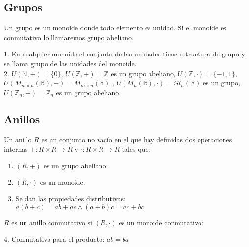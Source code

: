 \subsection{Grupos}

\begin{definition}[Grupo]
Un grupo es un monoide donde todo elemento es unidad. Si el monoide es conmutativo lo llamaremos grupo abeliano.
\end{definition}

\begin{example}
1. En cualquier monoide el conjunto de las unidades tiene estructura de grupo y se llama grupo de las unidades del monoide.\\
2. $U(\mathbb{N},+) = \{0\}$, $U(\mathbb{Z},+) = \mathbb{Z}$ es un grupo abeliano, $U(\mathbb{Z},\cdot) = \{-1,1\}$, $U(M_{m \times n}(\mathbb{R}),+) = M_{m \times n}(\mathbb{R})$ , $U(M_n(\mathbb{R}),\cdot) = Gl_n(\mathbb{R})$ es un grupo, $U(\mathbb{Z}_n,+) = \mathbb{Z}_n$ es un grupo abeliano.
\end{example}


\subsection{Anillos}

\begin{definition}[Anillo]
Un anillo $R$ es un conjunto no vacío en el que hay definidas dos operaciones internas $+:R \times R \rightarrow R$ y $\cdot:R \times R \rightarrow R$ tales que:

\begin{enumerate}
\item $(R,+)$ es un grupo abeliano.
\item $(R,\cdot)$ es un monoide. 
\item Se dan las propiedades distributivas: $a(b+c) = ab+ac \land (a+b)c = ac+bc$
\end{enumerate}

$R$ es un anillo conmutativo si $(R,\cdot)$ es un monoide conmutativo:

4. Conmutativa para el producto: $ab = ba$
\end{definition}


